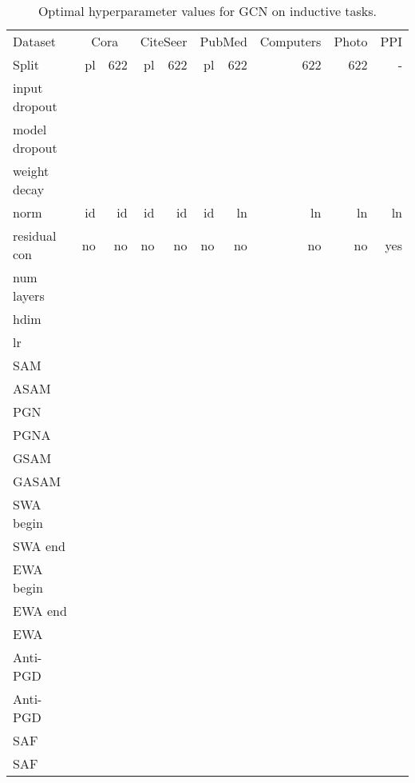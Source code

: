 \documentclass[runningheads]{llncs}
\begin{document}
\begin{table*}[!hb]
    \centering   
        \caption{Optimal hyperparameter values for GCN on inductive tasks.}
    \label{tab:gcn_params_ind}
    \tiny
    \begin{tabular}{l|r r | r r | r r | r | r | r }\toprule
    Dataset       & \multicolumn{2}{c|}{Cora} & \multicolumn{2}{c|}{CiteSeer} & \multicolumn{2}{c|}{PubMed} & Computers & Photo & PPI\\
    Split         & pl & 622 & pl & 622 & pl & 622 & 622 & 622 & -\\ \midrule
    input dropout &  &  &  &  &  &  &  &  &   \\
    model dropout &  &   &  &  &  &  &  &  &   \\
    weight decay  &  &  &  &  &  &  &  &  &   \\
    norm          & id & id & id & id & id & ln & ln & ln & ln  \\
    residual con           & no & no & no & no & no & no & no & no & yes  \\
    num layers    &  &  &  &  &  &  &  &  &   \\
    hdim          &  &  &  &  &  &  &  &  &   \\
    lr            &  &  &  &  &  &  &  &  &  \\ \midrule
    SAM        &  &  &  &  &  &  &  &  &   \\
    ASAM       &  &  &  &  &  &  &  &  &  \\
    PGN    &  &  &  &  &  &  &  &  &   \\
    PGNA    &  &  &  &  &  &  &  &  &  \\
    GSAM    &  &  &  &  &  &  &  &  &    \\
    GASAM   &  &  &  &  &  &  &  &  &   \\
    SWA begin     &  &  &  &  &  &  &  &  &  \\
    SWA end       &  &  &  &  &  &  &  &  &  \\
    EWA begin     &  &  &  &  &  &  &  &  &  \\
    EWA end       &  &  &  &  &  &  &  &  &  \\
    EWA   &  &  &  &  &  &  &  &  &  \\
    Anti-PGD  &  &  &  &  &  &  &  &  &  \\
    Anti-PGD  &  &  &  &  &  &  &  &  &  \\
    SAF    &  &  &  &  &  &  &  &  &  \\
    SAF       &  &  &  &  &  &  &  &  & \\
    \bottomrule
    \end{tabular}

\end{table*}
\end{document}
